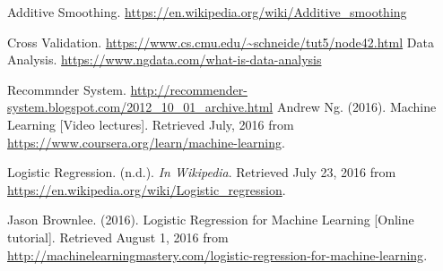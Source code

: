 \begin{thebibliography}{9}
	Additive Smoothing. \url{https://en.wikipedia.org/wiki/Additive_smoothing}

Cross Validation. \url{https://www.cs.cmu.edu/~schneide/tut5/node42.html}
Data Analysis. \url{https://www.ngdata.com/what-is-data-analysis}

 Recommnder System. \url{http://recommender-system.blogspot.com/2012_10_01_archive.html}
  Andrew Ng. (2016). Machine Learning [Video lectures].
  Retrieved July, 2016 from \url{https://www.coursera.org/learn/machine-learning}.

  Logistic Regression. (n.d.). {\em In Wikipedia}. Retrieved July 23, 2016 from
  \url{https://en.wikipedia.org/wiki/Logistic_regression}.

  Jason Brownlee. (2016). Logistic Regression for Machine Learning [Online tutorial].
  Retrieved August 1, 2016 from
  \url{http://machinelearningmastery.com/logistic-regression-for-machine-learning}.

\end{thebibliography}
